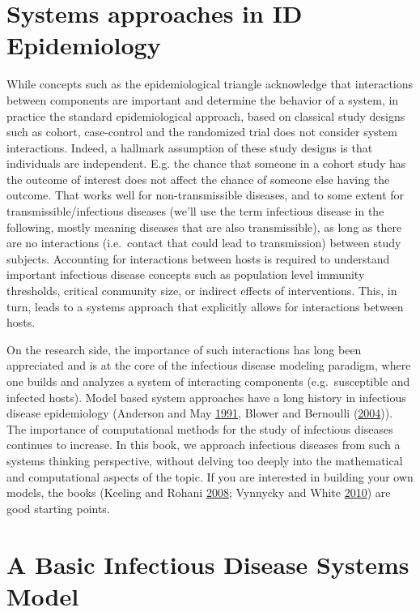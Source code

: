 \documentclass[]{book}
\theoremstyle{definition}
\theoremstyle{definition}
\theoremstyle{definition}
\theoremstyle{remark}
\begin{document}
\section{Systems approaches in ID
Epidemiology}\label{systems-approaches-in-id-epidemiology}

While concepts such as the epidemiological triangle acknowledge that
interactions between components are important and determine the behavior
of a system, in practice the standard epidemiological approach, based on
classical study designs such as cohort, case-control and the randomized
trial does not consider system interactions. Indeed, a hallmark
assumption of these study designs is that individuals are independent.
E.g. the chance that someone in a cohort study has the outcome of
interest does not affect the chance of someone else having the outcome.
That works well for non-transmissible diseases, and to some extent for
transmissible/infectious diseases (we'll use the term infectious disease
in the following, mostly meaning diseases that are also transmissible),
as long as there are no interactions (i.e.~contact that could lead to
transmission) between study subjects. Accounting for interactions
between hosts is required to understand important infectious disease
concepts such as population level immunity thresholds, critical
community size, or indirect effects of interventions. This, in turn,
leads to a systems approach that explicitly allows for interactions
between hosts.

On the research side, the importance of such interactions has long been
appreciated and is at the core of the infectious disease modeling
paradigm, where one builds and analyzes a system of interacting
components (e.g.~susceptible and infected hosts). Model based system
approaches have a long history in infectious disease epidemiology
(Anderson and May \protect\hyperlink{ref-anderson91}{1991}, Blower and
Bernoulli (\protect\hyperlink{ref-blower04}{2004})). The importance of
computational methods for the study of infectious diseases continues to
increase. In this book, we approach infectious diseases from such a
systems thinking perspective, without delving too deeply into the
mathematical and computational aspects of the topic. If you are
interested in building your own models, the books (Keeling and Rohani
\protect\hyperlink{ref-keeling08}{2008}; Vynnycky and White
\protect\hyperlink{ref-vynnycky10}{2010}) are good starting points.

\section{A Basic Infectious Disease Systems
Model}\label{a-basic-infectious-disease-systems-model}
\end{document}
